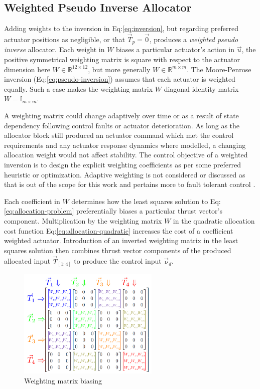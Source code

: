 \subsection{Weighted Pseudo Inverse Allocator}
\label{subsec:allocation.allocators.weightedinverse}
Adding weights to the inversion in Eq:\ref{eq:inversion}, but regarding preferred actuator positions as negligible, or that $\vec{T}_p=\vec{0}$, produces a \emph{weighted pseudo inverse} allocator. Each weight in $W$ biases a particular actuator's action in $\vec{u}$, the positive symmetrical weighting matrix is square with respect to the actuator dimension here $W\in\mathbb{R}^{12\times 12}$, but more generally $W\in\mathbb{R}^{m\times m}$. The Moore-Penrose inversion (Eq:\ref{eq:pseudo-inversion}) assumes that each actuator is weighted equally. Such a case makes the weighting matrix $W$ diagonal identity matrix $W = \mathbb{I}_{m\times m}$. 
\par
A weighting matrix could change adaptively over time or as a result of state dependency following control faults or actuator deterioration. As long as the allocator block still produced an actuator command which met the control requirements and any actuator response dynamics where modelled, a changing allocation weight would not affect stability. The control objective of a weighted inversion is to design the explicit weighting coefficients as per some preferred heuristic or optimization. Adaptive weighting is not considered or discussed as that is out of the scope for this work and pertains more to fault tolerant control \cite{FTCallocation}.
\par
Each coefficient in $W$ determines how the least squares solution to Eq:\ref{eq:allocation-problem} preferentially biases a particular thrust vector's component. Multiplication by the weighting matrix $W$ in the quadratic allocation cost function Eq:\ref{eq:allocation-quadratic} increases the cost of a coefficient weighted actuator. Introduction of an inverted weighting matrix in the least squares solution then combines thrust vector components of the produced allocated input $\vec{T}_{[1:4]}$ to produce the control input $\vec{\nu}_d$. 
\begin{figure}[htbp]
\vspace{-6pt}
\centering
\includegraphics[width=0.6\textwidth]{figs/weighted-matrix}
\vspace{-6pt}
\caption{Weighting matrix biasing}
\label{fig:weighted-matrix-allocation}
\vspace{-6pt}
\end{figure}
